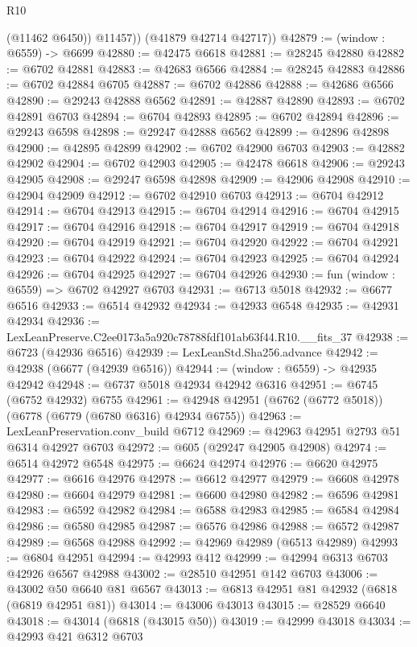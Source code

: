 \begin{lexlean}{R10}
\begin{coremodule}
            (@11462 @6450))
          @11457))
      (@41879 @42714 @42717))
@42879 := (window : @6559) -> @6699
@42880 := @42475 @6618
@42881 := @28245 @42880
@42882 := @6702 @42881
@42883 := @42683 @6566
@42884 := @28245 @42883
@42886 := @6702 @42884 @6705
@42887 := @6702 @42886
@42888 := @42686 @6566
@42890 := @29243 @42888 @6562
@42891 := @42887 @42890
@42893 := @6702 @42891 @6703
@42894 := @6704 @42893
@42895 := @6702 @42894
@42896 := @29243 @6598
@42898 := @29247 @42888 @6562
@42899 := @42896 @42898
@42900 := @42895 @42899
@42902 := @6702 @42900 @6703
@42903 := @42882 @42902
@42904 := @6702 @42903
@42905 := @42478 @6618
@42906 := @29243 @42905
@42908 := @29247 @6598 @42898
@42909 := @42906 @42908
@42910 := @42904 @42909
@42912 := @6702 @42910 @6703
@42913 := @6704 @42912
@42914 := @6704 @42913
@42915 := @6704 @42914
@42916 := @6704 @42915
@42917 := @6704 @42916
@42918 := @6704 @42917
@42919 := @6704 @42918
@42920 := @6704 @42919
@42921 := @6704 @42920
@42922 := @6704 @42921
@42923 := @6704 @42922
@42924 := @6704 @42923
@42925 := @6704 @42924
@42926 := @6704 @42925
@42927 := @6704 @42926
@42930 := fun (window : @6559) => @6702 @42927 @6703
@42931 := @6713 @5018
@42932 := @6677 @6516
@42933 := @6514 @42932
@42934 := @42933 @6548
@42935 := @42931 @42934
@42936 := LexLeanPreserve.C2ee0173a5a920c78788fdf101ab63f44.R10.__fits_37
@42938 := @6723 (@42936 @6516)
@42939 := LexLeanStd.Sha256.advance
@42942 := @42938 (@6677 (@42939 @6516))
@42944 := (window : @6559) -> @42935 @42942
@42948 := @6737 @5018 @42934 @42942 @6316
@42951 := @6745 (@6752 @42932) @6755
@42961 := @42948 @42951 (@6762 (@6772 @5018)) (@6778 (@6779 (@6780 @6316) @42934 @6755))
@42963 := LexLeanPreservation.conv_build @6712
@42969 := @42963 @42951 @2793 @51 @6314 @42927 @6703
@42972 := @605 (@29247 @42905 @42908)
@42974 := @6514 @42972 @6548
@42975 := @6624 @42974
@42976 := @6620 @42975
@42977 := @6616 @42976
@42978 := @6612 @42977
@42979 := @6608 @42978
@42980 := @6604 @42979
@42981 := @6600 @42980
@42982 := @6596 @42981
@42983 := @6592 @42982
@42984 := @6588 @42983
@42985 := @6584 @42984
@42986 := @6580 @42985
@42987 := @6576 @42986
@42988 := @6572 @42987
@42989 := @6568 @42988
@42992 := @42969 @42989 (@6513 @42989)
@42993 := @6804 @42951
@42994 := @42993 @412
@42999 := @42994 @6313 @6703 @42926 @6567 @42988
@43002 := @28510 @42951 @142 @6703
@43006 := @43002 @50 @6640 @81 @6567
@43013 := @6813 @42951 @81 @42932 (@6818 (@6819 @42951 @81))
@43014 := @43006 @43013
@43015 := @28529 @6640
@43018 := @43014 (@6818 (@43015 @50))
@43019 := @42999 @43018
@43034 := @42993
    @421
    @6312
    @6703

\end{coremodule}
\end{lexlean}
